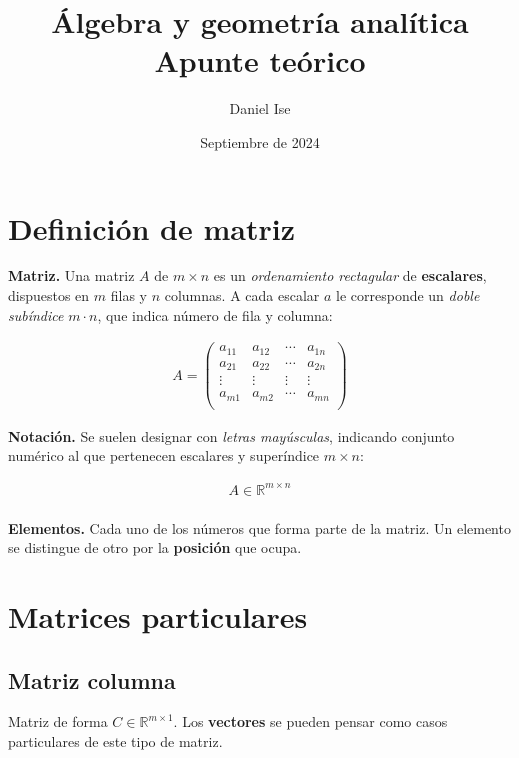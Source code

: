 \documentclass[12pt]{article}
\title{Álgebra y geometría analítica\\Apunte teórico}
\author{Daniel Ise}
\date{Septiembre de 2024}
\begin{document}
\maketitle

\tableofcontents

\pagebreak

\section{Definición de matriz}

\textbf{Matriz.}
Una matriz \(A \text{ de }m \times n\)
es un \textit{ordenamiento rectagular} de \textbf{escalares},
dispuestos en \(m\) filas y \(n\) columnas.
A cada escalar \(a\) le corresponde un \textit{doble subíndice} \(m\cdot n\),
que indica número de fila y columna:

\begin{align*}
  A = \begin{pmatrix}
        a_{11} & a_{12} & \cdots & a_{1n} \\
        a_{21} & a_{22} & \cdots & a_{2n} \\
        \vdots & \vdots & \vdots & \vdots \\
        a_{m1} & a_{m2} & \cdots & a_{mn} \\
      \end{pmatrix}
\end{align*}

\textbf{Notación.}
Se suelen designar con \textit{letras mayúsculas},
indicando conjunto numérico al que pertenecen escalares
y superíndice \(m \times n\):

\begin{align*}
  A \in \mathbb{R}^{m \times n} \\
\end{align*}

\textbf{Elementos.}
Cada uno de los números que forma parte de la matriz.
Un elemento se distingue de otro por la \textbf{posición} que ocupa.

\section{Matrices particulares}

\subsection{Matriz columna}

Matriz de forma \(C \in \mathbb{R}^{m \times 1}\).
Los \textbf{vectores} se pueden pensar como
casos particulares de este tipo de matriz.
\end{document}
